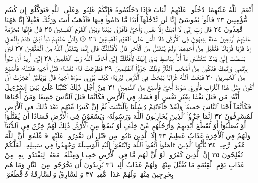 أَنْعَمَ ٱللَّهُ عَلَيْهِمَا ٱدْخُلُوا۟ عَلَيْهِمُ ٱلْبَابَ فَإِذَا دَخَلْتُمُوهُ فَإِنَّكُمْ
غَٰلِبُونَۚ وَعَلَى ٱللَّهِ فَتَوَكَّلُوٓا۟ إِن كُنتُم مُّؤْمِنِينَ ٢٣
قَالُوا۟ يَٰمُوسَىٰٓ إِنَّا لَن نَّدْخُلَهَآ أَبَدࣰا مَّا دَامُوا۟ فِيهَا فَٱذْهَبْ
أَنتَ وَرَبُّكَ فَقَٰتِلَآ إِنَّا هَٰهُنَا قَٰعِدُونَ ٢٤ قَالَ رَبِّ إِنِّي
لَآ أَمْلِكُ إِلَّا نَفْسِي وَأَخِيۖ فَٱفْرُقْ بَيْنَنَا وَبَيْنَ ٱلْقَوْمِ
ٱلْفَٰسِقِينَ ٢٥ قَالَ فَإِنَّهَا مُحَرَّمَةٌ عَلَيْهِمْۛ أَرْبَعِينَ سَنَةࣰۛ
يَتِيهُونَ فِي ٱلْأَرْضِۚ فَلَا تَأْسَ عَلَى ٱلْقَوْمِ ٱلْفَٰسِقِينَ ٢٦
۞ وَٱتْلُ عَلَيْهِمْ نَبَأَ ٱبْنَيْ ءَادَمَ بِٱلْحَقِّ إِذْ قَرَّبَا قُرْبَانࣰا فَتُقُبِّلَ
مِنْ أَحَدِهِمَا وَلَمْ يُتَقَبَّلْ مِنَ ٱلْأٓخَرِ قَالَ لَأَقْتُلَنَّكَۖ
قَالَ إِنَّمَا يَتَقَبَّلُ ٱللَّهُ مِنَ ٱلْمُتَّقِينَ ٢٧ لَئِنۢ بَسَطتَ إِلَيَّ يَدَكَ
لِتَقْتُلَنِي مَآ أَنَا۠ بِبَاسِطࣲ يَدِيَ إِلَيْكَ لِأَقْتُلَكَۖ إِنِّيٓ أَخَافُ ٱللَّهَ
رَبَّ ٱلْعَٰلَمِينَ ٢٨ إِنِّيٓ أُرِيدُ أَن تَبُوٓأَ بِإِثْمِي وَإِثْمِكَ فَتَكُونَ
مِنْ أَصْحَٰبِ ٱلنَّارِۚ وَذَٰلِكَ جَزَٰٓؤُا۟ ٱلظَّٰلِمِينَ ٢٩ فَطَوَّعَتْ
لَهُۥ نَفْسُهُۥ قَتْلَ أَخِيهِ فَقَتَلَهُۥ فَأَصْبَحَ مِنَ ٱلْخَٰسِرِينَ ٣٠
فَبَعَثَ ٱللَّهُ غُرَابࣰا يَبْحَثُ فِي ٱلْأَرْضِ لِيُرِيَهُۥ كَيْفَ يُوَٰرِي
سَوْءَةَ أَخِيهِۚ قَالَ يَٰوَيْلَتَىٰٓ أَعَجَزْتُ أَنْ أَكُونَ مِثْلَ هَٰذَا
ٱلْغُرَابِ فَأُوَٰرِيَ سَوْءَةَ أَخِيۖ فَأَصْبَحَ مِنَ ٱلنَّٰدِمِينَ ٣١
مِنْ أَجْلِ ذَٰلِكَ كَتَبْنَا عَلَىٰ بَنِيٓ إِسْرَٰٓءِيلَ أَنَّهُۥ مَن قَتَلَ
نَفْسَۢا بِغَيْرِ نَفْسٍ أَوْ فَسَادࣲ فِي ٱلْأَرْضِ فَكَأَنَّمَا قَتَلَ
ٱلنَّاسَ جَمِيعࣰا وَمَنْ أَحْيَاهَا فَكَأَنَّمَآ أَحْيَا ٱلنَّاسَ
جَمِيعࣰاۚ وَلَقَدْ جَآءَتْهُمْ رُسُلُنَا بِٱلْبَيِّنَٰتِ ثُمَّ إِنَّ كَثِيرࣰا
مِّنْهُم بَعْدَ ذَٰلِكَ فِي ٱلْأَرْضِ لَمُسْرِفُونَ ٣٢ إِنَّمَا
جَزَٰٓؤُا۟ ٱلَّذِينَ يُحَارِبُونَ ٱللَّهَ وَرَسُولَهُۥ وَيَسْعَوْنَ فِي
ٱلْأَرْضِ فَسَادًا أَن يُقَتَّلُوٓا۟ أَوْ يُصَلَّبُوٓا۟ أَوْ تُقَطَّعَ أَيْدِيهِمْ
وَأَرْجُلُهُم مِّنْ خِلَٰفٍ أَوْ يُنفَوْا۟ مِنَ ٱلْأَرْضِۚ ذَٰلِكَ
لَهُمْ خِزْيࣱ فِي ٱلدُّنْيَاۖ وَلَهُمْ فِي ٱلْأٓخِرَةِ عَذَابٌ عَظِيمٌ ٣٣
إِلَّا ٱلَّذِينَ تَابُوا۟ مِن قَبْلِ أَن تَقْدِرُوا۟ عَلَيْهِمْۖ فَٱعْلَمُوٓا۟
أَنَّ ٱللَّهَ غَفُورࣱ رَّحِيمࣱ ٣٤ يَٰٓأَيُّهَا ٱلَّذِينَ ءَامَنُوا۟ ٱتَّقُوا۟
ٱللَّهَ وَٱبْتَغُوٓا۟ إِلَيْهِ ٱلْوَسِيلَةَ وَجَٰهِدُوا۟ فِي سَبِيلِهِۦ
لَعَلَّكُمْ تُفْلِحُونَ ٣٥ إِنَّ ٱلَّذِينَ كَفَرُوا۟ لَوْ أَنَّ لَهُم
مَّا فِي ٱلْأَرْضِ جَمِيعࣰا وَمِثْلَهُۥ مَعَهُۥ لِيَفْتَدُوا۟ بِهِۦ مِنْ
عَذَابِ يَوْمِ ٱلْقِيَٰمَةِ مَا تُقُبِّلَ مِنْهُمْۖ وَلَهُمْ عَذَابٌ أَلِيمࣱ ٣٦
يُرِيدُونَ أَن يَخْرُجُوا۟ مِنَ ٱلنَّارِ وَمَا هُم بِخَٰرِجِينَ مِنْهَاۖ
وَلَهُمْ عَذَابࣱ مُّقِيمࣱ ٣٧ وَٱلسَّارِقُ وَٱلسَّارِقَةُ فَٱقْطَعُوٓا۟
